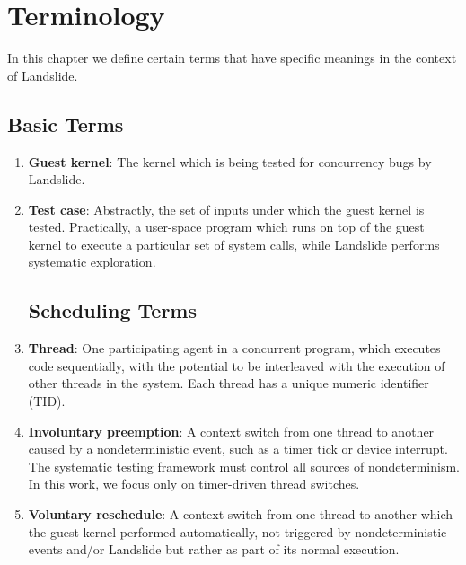 \chapter{Terminology}

In this chapter we define certain terms that have specific meanings in the context of Landslide.

\section{Basic Terms}

\begin{enumerate}
	\item {\bf Guest kernel}:
		The kernel which is being tested for concurrency bugs by Landslide.
	\item {\bf Test case}:
		Abstractly, the set of inputs under which the guest kernel is tested. Practically, a user-space program which runs on top of the guest kernel to execute a particular set of system calls, while Landslide performs systematic exploration.

\section{Scheduling Terms}


	\item {\bf Thread}:
		One participating agent in a concurrent program, which executes code sequentially, with the potential to be interleaved with the execution of other threads in the system.
		Each thread has a unique numeric identifier (TID).
	\item {\bf Involuntary preemption}:
		A context switch from one thread to another caused by a nondeterministic event, such as a timer tick or device interrupt. The systematic testing framework must control all sources of nondeterminism. In this work, we focus only on timer-driven thread switches.
	\item {\bf Voluntary reschedule}:
		A context switch from one thread to another which the guest kernel performed automatically, not triggered by nondeterministic events and/or Landslide but rather as part of its normal execution.


\end{enumerate}

